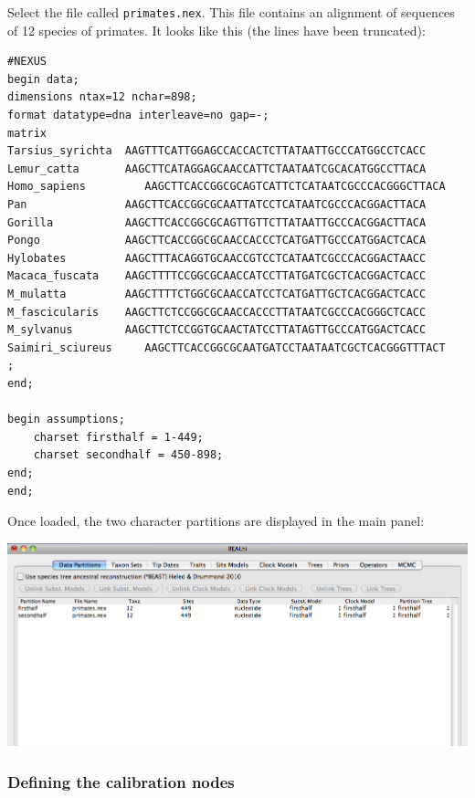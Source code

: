 \documentclass[12pt]{article}
\begin{document}
\medskip{}

Select the file called \texttt{primates.nex}. This file contains an alignment
of sequences of 12 species of primates. It looks like
this (the lines have been truncated):

\begin{verbatim}
#NEXUS
begin data;
dimensions ntax=12 nchar=898;
format datatype=dna interleave=no gap=-;
matrix
Tarsius_syrichta  AAGTTTCATTGGAGCCACCACTCTTATAATTGCCCATGGCCTCACC
Lemur_catta       AAGCTTCATAGGAGCAACCATTCTAATAATCGCACATGGCCTTACA
Homo_sapiens	     AAGCTTCACCGGCGCAGTCATTCTCATAATCGCCCACGGGCTTACA
Pan               AAGCTTCACCGGCGCAATTATCCTCATAATCGCCCACGGACTTACA
Gorilla           AAGCTTCACCGGCGCAGTTGTTCTTATAATTGCCCACGGACTTACA
Pongo             AAGCTTCACCGGCGCAACCACCCTCATGATTGCCCATGGACTCACA
Hylobates         AAGCTTTACAGGTGCAACCGTCCTCATAATCGCCCACGGACTAACC
Macaca_fuscata    AAGCTTTTCCGGCGCAACCATCCTTATGATCGCTCACGGACTCACC
M_mulatta         AAGCTTTTCTGGCGCAACCATCCTCATGATTGCTCACGGACTCACC
M_fascicularis    AAGCTTCTCCGGCGCAACCACCCTTATAATCGCCCACGGGCTCACC
M_sylvanus        AAGCTTCTCCGGTGCAACTATCCTTATAGTTGCCCATGGACTCACC
Saimiri_sciureus	 AAGCTTCACCGGCGCAATGATCCTAATAATCGCTCACGGGTTTACT
;
end;

begin assumptions;
	charset firsthalf = 1-449;
	charset secondhalf = 450-898;
end;
end;\end{verbatim}

\medskip{}

Once loaded, the two character partitions are displayed in the main panel:

\medskip{}

\includegraphics[scale=0.4]{figures/BEAUti_DataPartitions}

\medskip{}

\subsubsection*{Defining the calibration nodes}
\end{document}
